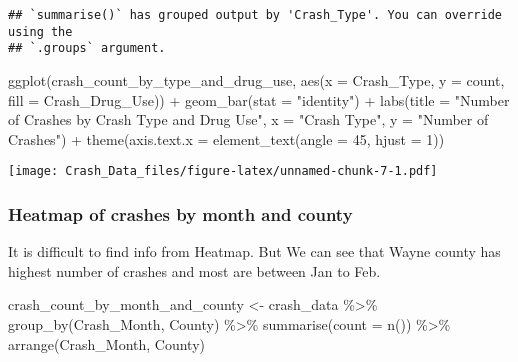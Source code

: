 \documentclass[
]{article}
\newenvironment{Shaded}{\begin{snugshade}}{\end{snugshade}}
\newcommand{\AttributeTok}[1]{\textcolor[rgb]{0.77,0.63,0.00}{#1}}
\newcommand{\DecValTok}[1]{\textcolor[rgb]{0.00,0.00,0.81}{#1}}
\newcommand{\FunctionTok}[1]{\textcolor[rgb]{0.00,0.00,0.00}{#1}}
\newcommand{\NormalTok}[1]{#1}
\newcommand{\OtherTok}[1]{\textcolor[rgb]{0.56,0.35,0.01}{#1}}
\newcommand{\SpecialCharTok}[1]{\textcolor[rgb]{0.00,0.00,0.00}{#1}}
\newcommand{\StringTok}[1]{\textcolor[rgb]{0.31,0.60,0.02}{#1}}
\begin{document}
\begin{verbatim}
## `summarise()` has grouped output by 'Crash_Type'. You can override using the
## `.groups` argument.
\end{verbatim}

\begin{Shaded}
\begin{Highlighting}[]
\FunctionTok{ggplot}\NormalTok{(crash\_count\_by\_type\_and\_drug\_use, }\FunctionTok{aes}\NormalTok{(}\AttributeTok{x =}\NormalTok{ Crash\_Type, }\AttributeTok{y =}\NormalTok{ count, }\AttributeTok{fill =}\NormalTok{ Crash\_Drug\_Use)) }\SpecialCharTok{+}
  \FunctionTok{geom\_bar}\NormalTok{(}\AttributeTok{stat =} \StringTok{"identity"}\NormalTok{) }\SpecialCharTok{+}
  \FunctionTok{labs}\NormalTok{(}\AttributeTok{title =} \StringTok{"Number of Crashes by Crash Type and Drug Use"}\NormalTok{, }\AttributeTok{x =} \StringTok{"Crash Type"}\NormalTok{, }\AttributeTok{y =} \StringTok{"Number of Crashes"}\NormalTok{) }\SpecialCharTok{+}
  \FunctionTok{theme}\NormalTok{(}\AttributeTok{axis.text.x =} \FunctionTok{element\_text}\NormalTok{(}\AttributeTok{angle =} \DecValTok{45}\NormalTok{, }\AttributeTok{hjust =} \DecValTok{1}\NormalTok{))}
\end{Highlighting}
\end{Shaded}

\texttt{[image: Crash\_Data\_files/figure-latex/unnamed-chunk-7-1.pdf]}

\hypertarget{heatmap-of-crashes-by-month-and-county}{%
\subsubsection{Heatmap of crashes by month and
county}\label{heatmap-of-crashes-by-month-and-county}}

It is difficult to find info from Heatmap. But We can see that Wayne
county has highest number of crashes and most are between Jan to Feb.

\begin{Shaded}
\begin{Highlighting}[]
\NormalTok{crash\_count\_by\_month\_and\_county }\OtherTok{\textless{}{-}}\NormalTok{ crash\_data }\SpecialCharTok{\%\textgreater{}\%}
  \FunctionTok{group\_by}\NormalTok{(Crash\_Month, County) }\SpecialCharTok{\%\textgreater{}\%}
  \FunctionTok{summarise}\NormalTok{(}\AttributeTok{count =} \FunctionTok{n}\NormalTok{()) }\SpecialCharTok{\%\textgreater{}\%}
  \FunctionTok{arrange}\NormalTok{(Crash\_Month, County)}
\end{Highlighting}
\end{Shaded}
\end{document}
